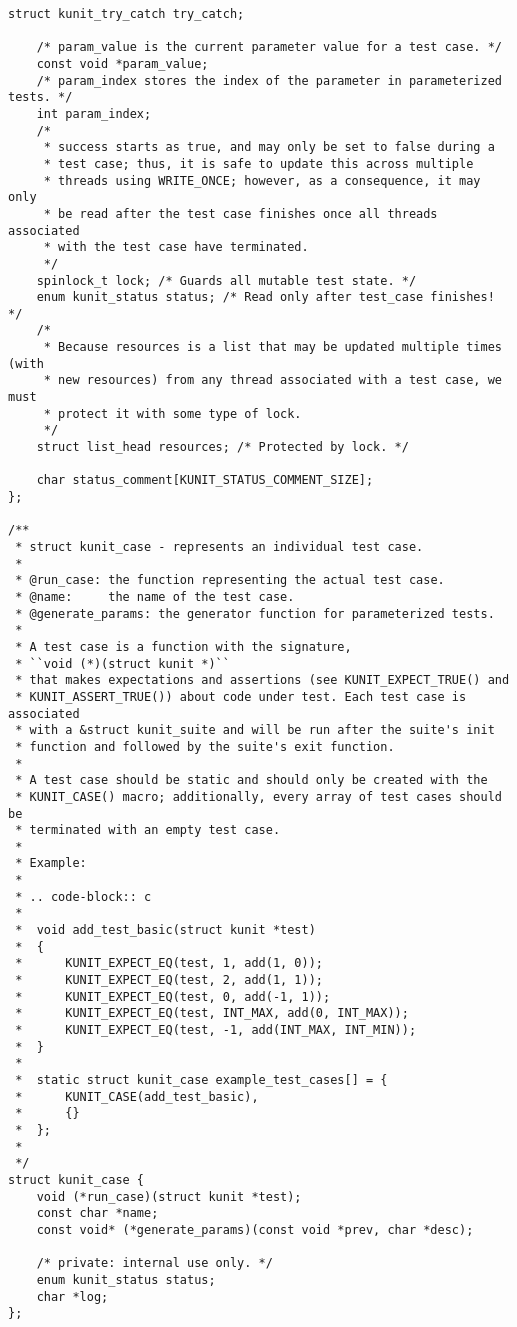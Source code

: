 \documentclass{article}
\begin{document}
\begin{lstlisting}[style=CStyle]
	struct kunit_try_catch try_catch;

	/* param_value is the current parameter value for a test case. */
	const void *param_value;
	/* param_index stores the index of the parameter in parameterized tests. */
	int param_index;
	/*
	 * success starts as true, and may only be set to false during a
	 * test case; thus, it is safe to update this across multiple
	 * threads using WRITE_ONCE; however, as a consequence, it may only
	 * be read after the test case finishes once all threads associated
	 * with the test case have terminated.
	 */
	spinlock_t lock; /* Guards all mutable test state. */
	enum kunit_status status; /* Read only after test_case finishes! */
	/*
	 * Because resources is a list that may be updated multiple times (with
	 * new resources) from any thread associated with a test case, we must
	 * protect it with some type of lock.
	 */
	struct list_head resources; /* Protected by lock. */

	char status_comment[KUNIT_STATUS_COMMENT_SIZE];
};

/**
 * struct kunit_case - represents an individual test case.
 *
 * @run_case: the function representing the actual test case.
 * @name:     the name of the test case.
 * @generate_params: the generator function for parameterized tests.
 *
 * A test case is a function with the signature,
 * ``void (*)(struct kunit *)``
 * that makes expectations and assertions (see KUNIT_EXPECT_TRUE() and
 * KUNIT_ASSERT_TRUE()) about code under test. Each test case is associated
 * with a &struct kunit_suite and will be run after the suite's init
 * function and followed by the suite's exit function.
 *
 * A test case should be static and should only be created with the
 * KUNIT_CASE() macro; additionally, every array of test cases should be
 * terminated with an empty test case.
 *
 * Example:
 *
 * .. code-block:: c
 *
 *	void add_test_basic(struct kunit *test)
 *	{
 *		KUNIT_EXPECT_EQ(test, 1, add(1, 0));
 *		KUNIT_EXPECT_EQ(test, 2, add(1, 1));
 *		KUNIT_EXPECT_EQ(test, 0, add(-1, 1));
 *		KUNIT_EXPECT_EQ(test, INT_MAX, add(0, INT_MAX));
 *		KUNIT_EXPECT_EQ(test, -1, add(INT_MAX, INT_MIN));
 *	}
 *
 *	static struct kunit_case example_test_cases[] = {
 *		KUNIT_CASE(add_test_basic),
 *		{}
 *	};
 *
 */
struct kunit_case {
	void (*run_case)(struct kunit *test);
	const char *name;
	const void* (*generate_params)(const void *prev, char *desc);

	/* private: internal use only. */
	enum kunit_status status;
	char *log;
};


\end{lstlisting}
\end{document}
